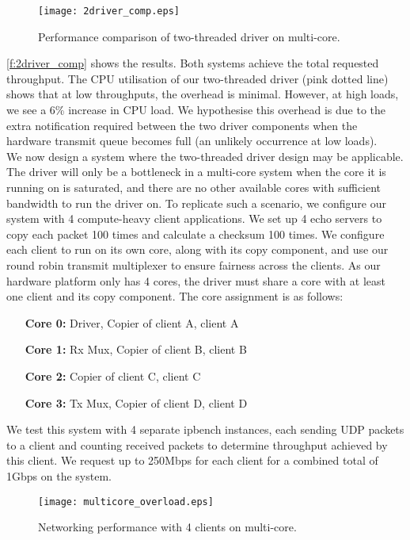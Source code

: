 \begin{figure}[h]
    \centering
    \texttt{[image: 2driver\_comp.eps]}
    \caption{Performance comparison of two-threaded driver on multi-core.}
    \label{f:2driver_comp}
\end{figure}

\autoref{f:2driver_comp} shows the results. Both systems achieve the total requested throughput. The CPU utilisation of our 
two-threaded driver (pink dotted line) shows that at low throughputs, the overhead is minimal. However, at high loads, we
see a 6\% increase in CPU load. We hypothesise this overhead is due to the extra notification required between the two 
driver components when the hardware transmit queue becomes full (an unlikely occurrence at low loads).\\

We now design a system where the two-threaded driver design may be applicable. The driver will only be a bottleneck in a
multi-core system when the core it is running on is saturated, and there are no other available cores with sufficient bandwidth
to run the driver on. To replicate such a scenario, we configure our system with 4 compute-heavy client applications. We set up
4 echo servers to copy each packet 100 times and calculate a checksum 100 times. We configure each client to run on its own
core, along with its copy component, and use our round robin transmit multiplexer to ensure fairness across the clients. 
As our hardware platform only has 4 cores, the driver must share a core with at least one client and 
its copy component. The core assignment is as follows:
\begin{itemize}
    \item[      \textbf{Core 0:}] Driver, Copier of client A, client A
    \item[      \textbf{Core 1:}] Rx Mux, Copier of client B, client B
    \item[      \textbf{Core 2:}] Copier of client C, client C
    \item[      \textbf{Core 3:}] Tx Mux, Copier of client D, client D
\end{itemize}

We test this system with 4 separate ipbench instances, each sending UDP packets to a client and counting received packets
to determine throughput achieved by this client. We request up to 250Mbps for each client for a combined total of 1Gbps on the system.

\begin{figure}[h]
    \centering
    \texttt{[image: multicore\_overload.eps]}
    \caption{Networking performance with 4 clients on multi-core.}
    \label{f:multicore_overload}
\end{figure}

